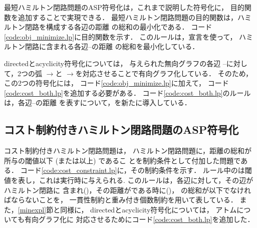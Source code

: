 最短ハミルトン閉路問題のASP符号化は，これまで説明した符号化に，
目的関数を追加することで実現できる．
最短ハミルトン閉路問題の目的関数は，ハミルトン閉路を構成する各辺の距離
の総和の最小化である．
コード\ref{code:obj_minimize.lp}に目的関数を示す．
このルールは，宣言を使って，
ハミルトン閉路に含まれる各辺--の距離
の総和を最小化している．

\textsf{directed}と\textsf{acyclicity}符号化については，
与えられた無向グラフの各辺
--に対して，2つの弧
$\rightarrow$と
$\rightarrow$を対応させることで有向グラフ化している．
そのため，この2つの符号化には，
コード\ref{code:obj_minimize.lp}に加えて，
コード\ref{code:cost_both.lp}を追加する必要がある．
コード\ref{code:cost_both.lp}のルールは，各辺--の距離
を表すについて，を新たに導入している．

\subsection{コスト制約付きハミルトン閉路問題のASP符号化}



コスト制約付きハミルトン閉路問題は，
ハミルトン閉路問題に，距離の総和が所与の閾値以下 (または以上) であるこ
とを制約条件として付加した問題である．
コード\ref{code:cost_constraint.lp}に，その制約条件を示す．
ルール中のは閾値を表し，これは実行時に与えられる.
このルールは，各辺に対して，その辺がハミルトン閉路に
含まれ()，その距離がである時に()，
の総和が以下でなければならないことを，
一貫性制約と重み付き個数制約を用いて表している．
また，\ref{minexpl}節と同様に，
\textsf{directed}と\textsf{acyclicity}符号化については，
アトムについても有向グラフ化に
対応させるためにコード\ref{code:cost_both.lp}を追加した．

